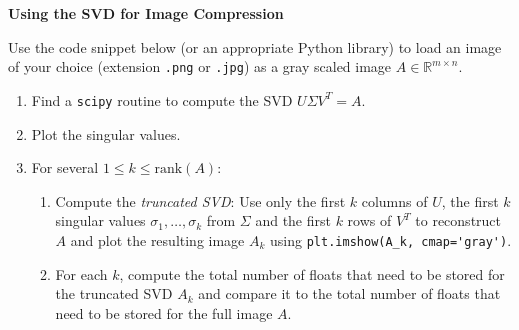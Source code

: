 \textbf{\normalsize Using the SVD for Image Compression}

Use the code snippet below (or an appropriate Python library) to load an image of your choice (extension \verb|.png| or \verb|.jpg|) as a gray scaled image $A \in \mathbb{R}^{m \times n}$.
\begin{enumerate}
	\item Find a \verb|scipy| routine to compute the SVD $U\Sigma V^T = A$.
	\item Plot the singular values.
	\item For several $1 \leq k \leq \text{rank}(A)$:
	\begin{enumerate}
		\item Compute the \textit{truncated SVD}: Use only the first $k$ columns of $U$, the first $k$ singular values $\sigma_1, \ldots, \sigma_k$ from $\Sigma$ and the first $k$ rows of $V^T$ to reconstruct $A$ and plot the resulting image $A_k$ using \verb|plt.imshow(A_k, cmap='gray')|.
		\item For each $k$, compute the total number of floats that need to be stored for the truncated SVD $A_k$ and compare it to the total number of floats that need to be stored for the full image $A$.
	\end{enumerate} 
\end{enumerate}

